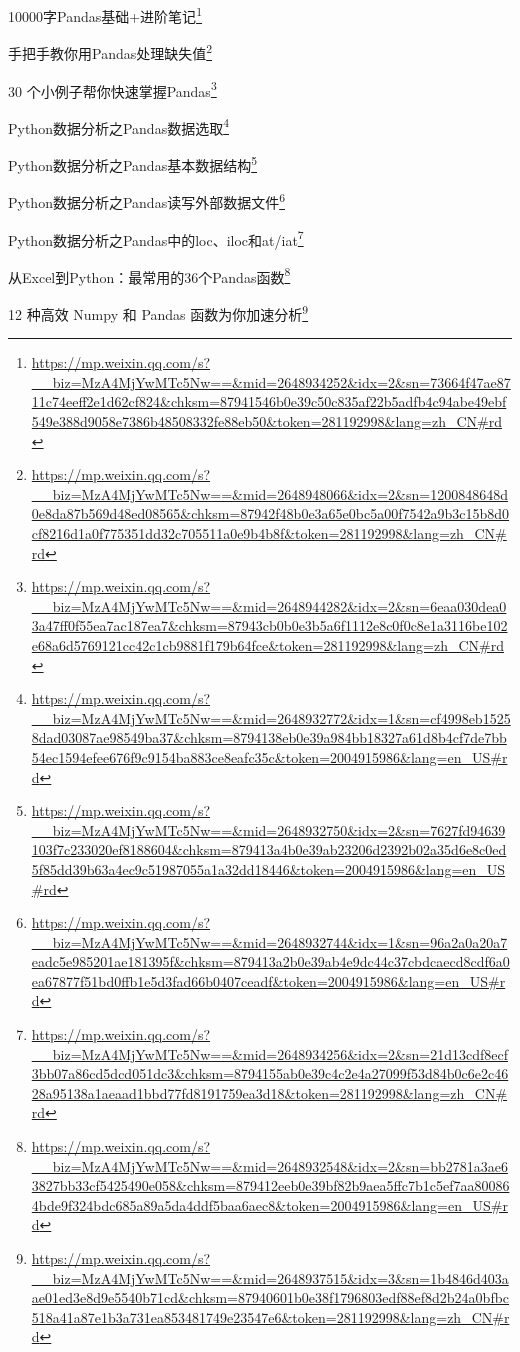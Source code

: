 \documentclass[]{ctexbook}
\renewcommand{\href}[2]{#2\footnote{\url{#1}}}
\begin{document}
\href{https://mp.weixin.qq.com/s?__biz=MzA4MjYwMTc5Nw==\&mid=2648934252\&idx=2\&sn=73664f47ae8711c74eeff2e1d62cf824\&chksm=87941546b0e39c50c835af22b5adfb4c94abe49ebf549e388d9058e7386b48508332fe88eb50\&token=281192998\&lang=zh_CN\#rd}{10000字Pandas基础+进阶笔记}

\href{https://mp.weixin.qq.com/s?__biz=MzA4MjYwMTc5Nw==\&mid=2648948066\&idx=2\&sn=1200848648d0e8da87b569d48ed08565\&chksm=87942f48b0e3a65e0bc5a00f7542a9b3c15b8d0cf8216d1a0f775351dd32c705511a0e9b4b8f\&token=281192998\&lang=zh_CN\#rd}{手把手教你用Pandas处理缺失值}

\href{https://mp.weixin.qq.com/s?__biz=MzA4MjYwMTc5Nw==\&mid=2648944282\&idx=2\&sn=6eaa030dea03a47ff0f55ea7ac187ea7\&chksm=87943cb0b0e3b5a6f1112e8c0f0c8e1a3116be102e68a6d5769121cc42c1cb9881f179b64fce\&token=281192998\&lang=zh_CN\#rd}{30 个小例子帮你快速掌握Pandas}

\href{https://mp.weixin.qq.com/s?__biz=MzA4MjYwMTc5Nw==\&mid=2648932772\&idx=1\&sn=cf4998eb15258dad03087ae98549ba37\&chksm=8794138eb0e39a984bb18327a61d8b4cf7de7bb54ec1594efee676f9c9154ba883ce8eafc35c\&token=2004915986\&lang=en_US\#rd}{Python数据分析之Pandas数据选取}

\href{https://mp.weixin.qq.com/s?__biz=MzA4MjYwMTc5Nw==\&mid=2648932750\&idx=2\&sn=7627fd94639103f7c233020ef8188604\&chksm=879413a4b0e39ab23206d2392b02a35d6e8c0ed5f85dd39b63a4ec9c51987055a1a32dd18446\&token=2004915986\&lang=en_US\#rd}{Python数据分析之Pandas基本数据结构}

\href{https://mp.weixin.qq.com/s?__biz=MzA4MjYwMTc5Nw==\&mid=2648932744\&idx=1\&sn=96a2a0a20a7eadc5e985201ae181395f\&chksm=879413a2b0e39ab4e9dc44c37cbdcaecd8cdf6a0ea67877f51bd0ffb1e5d3fad66b0407ceadf\&token=2004915986\&lang=en_US\#rd}{Python数据分析之Pandas读写外部数据文件}

\href{https://mp.weixin.qq.com/s?__biz=MzA4MjYwMTc5Nw==\&mid=2648934256\&idx=2\&sn=21d13cdf8ecf3bb07a86cd5dcd051dc3\&chksm=8794155ab0e39c4c2e4a27099f53d84b0c6e2c4628a95138a1aeaad1bbd77fd8191759ea3d18\&token=281192998\&lang=zh_CN\#rd}{Python数据分析之Pandas中的loc、iloc和at/iat}

\href{https://mp.weixin.qq.com/s?__biz=MzA4MjYwMTc5Nw==\&mid=2648932548\&idx=2\&sn=bb2781a3ae63827bb33cf5425490e058\&chksm=879412eeb0e39bf82b9aea5ffc7b1c5ef7aa800864bde9f324bdc685a89a5da4ddf5baa6aec8\&token=2004915986\&lang=en_US\#rd}{从Excel到Python：最常用的36个Pandas函数}

\href{https://mp.weixin.qq.com/s?__biz=MzA4MjYwMTc5Nw==\&mid=2648937515\&idx=3\&sn=1b4846d403aae01ed3e8d9e5540b71cd\&chksm=87940601b0e38f1796803edf88ef8d2b24a0bfbc518a41a87e1b3a731ea853481749e23547e6\&token=281192998\&lang=zh_CN\#rd}{12 种高效 Numpy 和 Pandas 函数为你加速分析}
\end{document}
